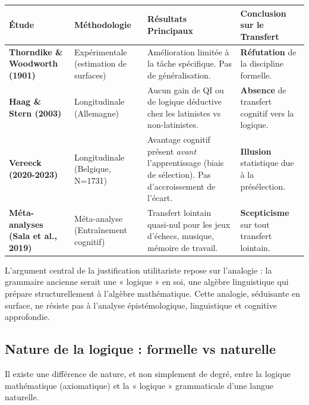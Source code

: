\begin{table}[h!]\small\centering\begin{tabular}{| p{2cm} | p{2.2cm} | p{2.2cm} | p{2.2cm} |}\hline\textbf{Étude} & \textbf{Méthodologie} & \textbf{Résultats Principaux} & \textbf{Conclusion sur le Transfert} \\ \hline\textbf{Thorndike \& Woodworth (1901)} & Expérimentale (estimation de surfaces) & Amélioration limitée à la tâche spécifique. Pas de généralisation. & \textbf{Réfutation} de la discipline formelle. \\ \hline\textbf{Haag \& Stern (2003)} & Longitudinale (Allemagne) & Aucun gain de QI ou de logique déductive chez les latinistes vs non-latinistes. & \textbf{Absence} de transfert cognitif vers la logique. \\ \hline\textbf{Vereeck (2020-2023)} & Longitudinale (Belgique, N=1731) & Avantage cognitif présent \textit{avant} l'apprentissage (biais de sélection). Pas d'accroissement de l'écart. & \textbf{Illusion} statistique due à la présélection. \\ \hline\textbf{Méta-analyses (Sala et al., 2019)} & Méta-analyse (Entraînement cognitif) & Transfert lointain quasi-nul pour les jeux d'échecs, musique, mémoire de travail. & \textbf{Scepticisme} sur tout transfert lointain. \\ \hline\end{tabular}\end{table}L'argument central de la justification utilitariste repose sur l'analogie : la grammaire ancienne
serait une « logique » en soi, une algèbre linguistique qui prépare structurellement à l'algèbre
mathématique. Cette analogie, séduisante en surface, ne résiste pas à l'analyse épistémologique,
linguistique et cognitive approfondie.



\subsection{Nature de la logique : formelle vs naturelle}

Il existe une différence de nature, et non simplement de degré, entre la logique mathématique
(axiomatique) et la « logique » grammaticale d'une langue naturelle.

